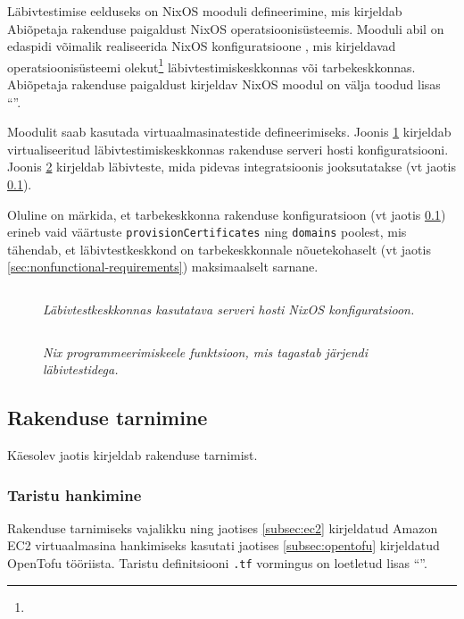 Läbivtestimise eelduseks on NixOS mooduli defineerimine, mis kirjeldab Abiõpetaja rakenduse paigaldust NixOS operatsioonisüsteemis. Mooduli abil on edaspidi võimalik realiseerida NixOS konfiguratsioone \cite{nixos-configuration}, mis kirjeldavad operatsioonisüsteemi olekut\footnote{\stateActually} läbivtestimiskeskkonnas või tarbekeskkonnas. Abiõpetaja rakenduse paigaldust kirjeldav NixOS moodul on välja toodud lisas ``''.

Moodulit saab kasutada virtuaalmasinatestide defineerimiseks. Joonis \ref{fig:test-vm-server} kirjeldab virtualiseeritud läbivtestimiskeskkonnas rakenduse serveri hosti konfiguratsiooni. Joonis \ref{fig:vm-tests} kirjeldab läbivteste, mida pidevas integratsioonis jooksutatakse (vt jaotis \ref{subsec:cicd}).

Oluline on märkida, et tarbekeskkonna rakenduse konfiguratsioon (vt jaotis \ref{subsec:cicd}) erineb vaid väärtuste \texttt{provisionCertificates} ning \texttt{domains} poolest, mis tähendab, et läbivtestkeskkond on tarbekeskkonnale nõuetekohaselt (vt jaotis \ref{sec:nonfunctional-requirements}) maksimaalselt sarnane.

\begin{figure}
\inputminted[breaklines]{nix}{chapters/data/test-vm-server.nix}
\caption{\emph{Läbivtestkeskkonnas kasutatava serveri hosti NixOS konfiguratsioon.}}\label{fig:test-vm-server}
\end{figure}

\begin{figure}
\inputminted[breaklines]{nix}{chapters/data/vm-tests.nix}
\caption{\emph{Nix programmeerimiskeele funktsioon, mis tagastab järjendi läbivtestidega.}}\label{fig:vm-tests}
\end{figure}

\subsection{Rakenduse tarnimine}\label{subsec:cicd}

Käesolev jaotis kirjeldab rakenduse tarnimist.

\subsubsection{Taristu hankimine}

Rakenduse tarnimiseks vajalikku ning jaotises \ref{subsec:ec2} kirjeldatud Amazon EC2 virtuaalmasina hankimiseks kasutati jaotises \ref{subsec:opentofu} kirjeldatud OpenTofu tööriista. Taristu definitsiooni \texttt{.tf} vormingus on loetletud lisas ``''.

